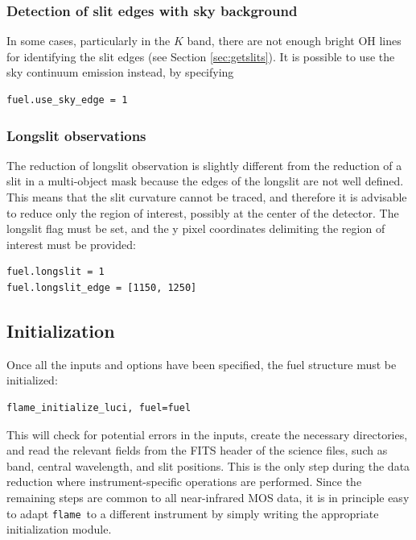 \documentclass[a4paper, notitlepage]{article}
\newcommand{\flame}{\texttt{flame}}
\begin{document}
\subsubsection{Detection of slit edges with sky background}
\label{sec:use_sky_edge}

In some cases, particularly in the $K$ band, there are not enough bright OH lines for identifying the slit edges (see Section \ref{sec:getslits}). It is possible to use the sky continuum emission instead, by specifying
\begin{lstlisting}
fuel.use_sky_edge = 1
\end{lstlisting}


\subsubsection{Longslit observations}

The reduction of longslit observation is slightly different from the reduction of a slit in a multi-object mask because the edges of the longslit are not well defined. This means that the slit curvature cannot be traced, and therefore it is advisable to reduce only the region of interest, possibly at the center of the detector. The longslit flag must be set, and the y pixel coordinates delimiting the region of interest must be provided:
\begin{lstlisting}
fuel.longslit = 1
fuel.longslit_edge = [1150, 1250]
\end{lstlisting}



\subsection{Initialization}

Once all the inputs and options have been specified, the fuel structure must be initialized:
\begin{lstlisting}
flame_initialize_luci, fuel=fuel
\end{lstlisting}
This will check for potential errors in the inputs, create the necessary directories, and read the relevant fields from the FITS header of the science files, such as band, central wavelength, and slit positions. This is the only step during the data reduction where instrument-specific operations are performed. Since the remaining steps are common to all near-infrared MOS data, it is in principle easy to adapt \flame\ to a different instrument by simply writing the appropriate initialization module.
\end{document}
